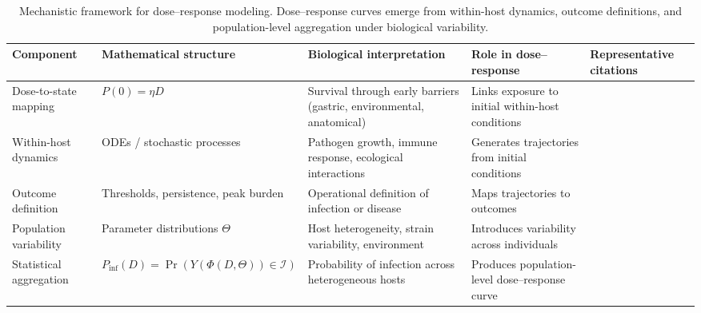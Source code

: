 \documentclass[11pt]{article}
\begin{document}
\begin{landscape}
\begin{table}[p]
\centering
\footnotesize
\setlength{\tabcolsep}{5pt}
\renewcommand{\arraystretch}{1.18}
\caption{Mechanistic framework for dose--response modeling. Dose--response curves emerge from within-host dynamics, outcome definitions, and population-level aggregation under biological variability.}
\label{tab:mechanistic_framework_generation}
\begin{tabularx}{\linewidth}{>{\raggedright\arraybackslash}p{2.7cm} >{\raggedright\arraybackslash}X >{\raggedright\arraybackslash}X >{\raggedright\arraybackslash}X >{\raggedright\arraybackslash}X}
\toprule
\textbf{Component} &
\textbf{Mathematical structure} &
\textbf{Biological interpretation} &
\textbf{Role in dose--response} &
\textbf{Representative citations} \\
\midrule

Dose-to-state mapping &
$P(0)=\eta D$ &
Survival through early barriers (gastric, environmental, anatomical) &
Links exposure to initial within-host conditions &
\cite{Abe2020CampyInvasion,Koseki2011GastricSurvival,Zhang2023Survival} \\

Within-host dynamics &
ODEs / stochastic processes &
Pathogen growth, immune response, ecological interactions &
Generates trajectories from initial conditions &
\cite{Mideo2008WithinHost,Moore2020InoculumImmune,Murray2002MathematicalBiology1,Perelson2002ModellingViral} \\

Outcome definition &
Thresholds, persistence, peak burden &
Operational definition of infection or disease &
Maps trajectories to outcomes &
\cite{Levin2001WithinHost,Moore2020InoculumImmune,Rahman2016Listeria} \\

Population variability &
Parameter distributions $\Theta$ &
Host heterogeneity, strain variability, environment &
Introduces variability across individuals &
\cite{Hamilton2024QMRAGaps,Pouillot2010,Pouillot2003Uncertainty,Teunis2002CryptoVariation} \\

Statistical aggregation &
$P_{\mathrm{inf}}(D)
=\Pr\left(
Y(\Phi(D,\Theta))
\in \mathcal I
\right)$ &
Probability of infection across heterogeneous hosts &
Produces population-level dose--response curve &
\cite{Hamilton2024QMRAGaps,Messner2001CryptosporidiumRisk} \\


\bottomrule
\end{tabularx}
\end{table}
\end{landscape}
\end{document}
